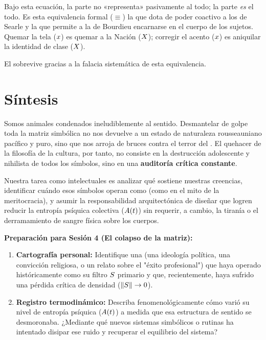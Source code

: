 Bajo esta ecuación, la parte no «representa» pasivamente al todo; la parte \textit{es} el todo. Es esta equivalencia formal ($\equiv$) la que dota de poder coactivo a los \HechosInstitucionales{} de Searle y la que permite a la \ViolenciaSimbolica{} de Bourdieu encarnarse en el cuerpo de los sujetos. Quemar la tela ($x$) es quemar a la Nación ($X$); corregir el acento ($x$) es aniquilar la identidad de clase ($X$). 

El \AnimalSimbolico{} sobrevive gracias a la falacia sistemática de esta equivalencia.

\section{Síntesis}

Somos animales condenados ineludiblemente al sentido. Desmantelar de golpe toda la matriz simbólica no nos devuelve a un estado de naturaleza rousseauniano pacífico y puro, sino que nos arroja de bruces contra el terror del \AbsolutismoRealidad. El quehacer de la filosofía de la cultura, por tanto, no consiste en la destrucción adolescente y nihilista de todos los símbolos, sino en una \textbf{auditoría crítica constante}. 

Nuestra tarea como intelectuales es analizar qué \RegimenVerdad{} sostiene nuestras creencias, identificar cuándo esos símbolos operan como \ViolenciaSimbolica{} (como en el mito de la meritocracia), y asumir la responsabilidad arquitectónica de diseñar \FormasSimbolicas{} que logren reducir la entropía psíquica colectiva ($A(t)$) sin requerir, a cambio, la tiranía o el derramamiento de sangre física sobre los cuerpos.

\begin{actividad}
\textbf{Preparación para Sesión 4 (El colapso de la matriz):}
\begin{enumerate}
    \item \textbf{Cartografía personal:} Identifique una \FormaSimbolica{} (una ideología política, una convicción religiosa, o un relato sobre el "éxito profesional") que haya operado históricamente como su filtro $S$ primario y que, recientemente, haya sufrido una pérdida crítica de densidad ($\|S\| \to 0$).
    \item \textbf{Registro termodinámico:} Describa fenomenológicamente cómo varió su nivel de entropía psíquica ($A(t)$) a medida que esa estructura de sentido se desmoronaba. ¿Mediante qué nuevos sistemas simbólicos o rutinas ha intentado disipar ese ruido y recuperar el equilibrio del sistema?
\end{enumerate}
\end{actividad}